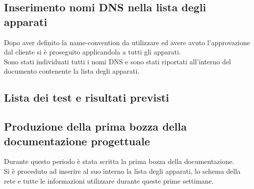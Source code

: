 \documentclass[Realizzazione.tex]{subfiles}
\begin{document}
\subsection{Inserimento nomi DNS nella lista degli apparati}
Dopo aver definito la name-convention da utilizzare ed avere avuto l'approvazione dal cliente si è proseguito applicandola a tutti gli apparati. \\
Sono stati individuati tutti i nomi DNS e sono stati riportati all'interno del documento contenente la lista degli apparati.

\subsection{Lista dei test e risultati previsti}
\subsection{Produzione della prima bozza della documentazione progettuale}
Durante questo periodo è stata scritta la prima bozza della documentazione. \\
Si è proceduto ad inserire al suo interno la lista degli apparati, lo schema della rete e tutte le informazioni utilizzare durante queste prime settimane.
\end{document}
